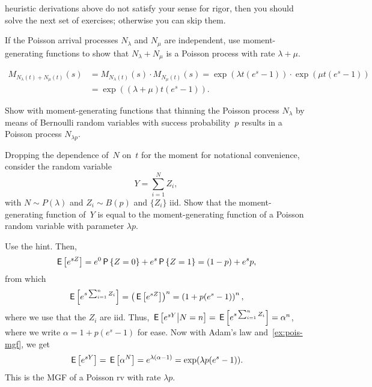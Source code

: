 \documentclass[stochastic-or.tex]{subfiles}
\begin{document}
 heuristic derivations above do not satisfy your sense for rigor, then you should solve the next set of exercises; otherwise you can skip them.



\begin{extra}\label{ex:41}
 If the Poisson arrival processes $N_\lambda$ and $N_\mu$ are independent, use moment-generating functions to show that $N_\lambda + N_\mu$ is a Poisson process with rate $\lambda + \mu$.
\begin{solution}
\begin{align*}
M_{N_\lambda(t)+N_\mu(t)}(s)
&= M_{N_\lambda(t)}(s)\cdot M_{N_{\mu}(t)}(s)
=\exp(\lambda t (e^s -1))\cdot \exp(\mu t(e^s-1)) \\
&= \exp((\lambda + \mu)t (e^s-1)).
\end{align*}
\end{solution}
\end{extra}



\begin{extra}\label{ex:1}
 Show with moment-generating functions that thinning the Poisson process $N_\lambda$ by means of Bernoulli random variables with success probability~$p$ results in a Poisson process $N_{\lambda p}$.
\begin{hint}
Dropping the dependence of~$N$ on~$t$ for the moment for notational convenience, consider the random variable
 \begin{equation*}
 Y = \sum_{i=1}^N Z_i,
 \end{equation*}
 with $N\sim P(\lambda)$ and $Z_i\sim B(p)$ and $\{Z_{i}\}$ iid.
Show that the moment-generating function of~$Y$ is equal to the moment-generating function of a Poisson random variable with parameter $\lambda p$.
\end{hint}
\begin{solution}
Use the hint. Then,
\begin{equation*}
 \,\mathsf{E}\left[e^{s Z}\right] = e^0 \,\mathsf{P}\left\{Z=0\right\} + e^{s} \,\mathsf{P}\left\{Z=1\right\} = (1-p) + e^s p,
\end{equation*}
from which
\begin{equation*}
\,\mathsf{E}\left[e^{s\sum_{i=1}^n Z_i}\right] = \left(\,\mathsf{E}\left[e^{s Z}\right]\right)^n = \left(1 + p (e^s - 1)\right)^n,
\end{equation*}
where we use that the $Z_i$  are iid.
Thus, $\,\mathsf{E}\left[e^{sY}\big|N=n\right] = \,\mathsf{E}\left[e^{s\sum_{i=1}^n Z_i}\right] = \alpha^{n}$, where we write $\alpha =1 + p (e^s - 1)$ for ease.
Now with Adam's law and~\cref{ex:pois-mgf}, we get
\begin{equation*}
\,\mathsf{E}\left[e^{sY}\right] = \,\mathsf{E}\left[\alpha^{N}\right] = e^{\lambda (\alpha - 1)} = \exp(\lambda p (e^s - 1)).
\end{equation*}
This is the MGF of a Poisson rv with rate $\lambda p$.
\end{solution}
\end{extra}

\end{document}
